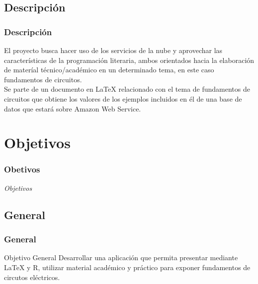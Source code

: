 \documentclass[11pt]{beamer}					%
\begin{document}
    		\subsection{Descripción}			
			\begin{frame}[fragile]
		\frametitle{Descripción}
			
		
			
			
El proyecto busca hacer uso de los servicios de la nube y aprovechar las características de la programación literaria, ambos orientados hacia la elaboración de materíal técnico/académico en un determinado tema, en este caso fundamentos de circuitos. \\
Se parte de un documento en LaTeX relacionado con el tema de fundamentos de circuitos que obtiene los valores de los ejemplos incluidos en él de una base de datos que estará sobre Amazon Web Service. 

			
				
	
			\end{frame}
			
			
				
				
	
			
			\section{Objetivos}	
		 \begin{frame}[fragile]
			\frametitle{Obetivos}
			\begin{huge}
			\begin{center}
				\emph{\textit{Objetivos}}
			\end{center}
			\end{huge}
		\end{frame}		
		\subsection{General}			
		 \begin{frame}[fragile]						%
			\frametitle{General}
			
			\begin{block}{Objetivo General}
Desarrollar una aplicación que permita presentar mediante LaTeX y R, utilizar material académico y práctico para exponer fundamentos de circutos eléctricos.		

\end{block}
		\end{frame}
		
\end{document}
